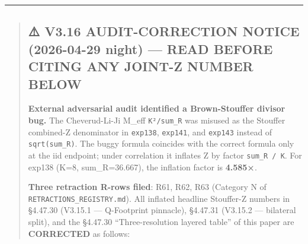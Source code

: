 \documentclass[
]{article}
\begin{document}
\begin{center}\rule{0.5\linewidth}{0.5pt}\end{center}

\begin{quote}
\mbox{}%
\subsection{⚠️ V3.16 AUDIT-CORRECTION NOTICE (2026-04-29 night) --- READ
BEFORE CITING ANY JOINT-Z NUMBER
BELOW}\label{v3.16-audit-correction-notice-2026-04-29-night-read-before-citing-any-joint-z-number-below}

\textbf{External adversarial audit identified a Brown-Stouffer divisor
bug.} The Cheverud-Li-Ji M\_eff \texttt{K²/sum\_R} was misused as the
Stouffer combined-Z denominator in \texttt{exp138}, \texttt{exp141}, and
\texttt{exp143} instead of \texttt{sqrt(sum\_R)}. The buggy formula
coincides with the correct formula only at the iid endpoint; under
correlation it inflates Z by factor \texttt{sum\_R\ /\ K}. For exp138
(K=8, sum\_R=36.667), the inflation factor is \textbf{4.585×}.

\textbf{Three retraction R-rows filed}: R61, R62, R63 (Category N of
\texttt{RETRACTIONS\_REGISTRY.md}). All inflated headline Stouffer-Z
numbers in §4.47.30 (V3.15.1 --- Q-Footprint pinnacle), §4.47.31
(V3.15.2 --- bilateral split), and the §4.47.30 ``Three-resolution
layered table'' of this paper are \textbf{CORRECTED} as follows:


\end{quote}
\end{document}
